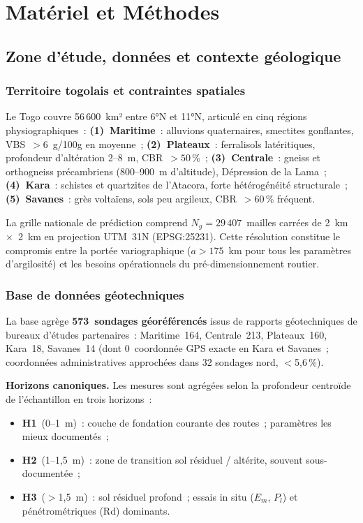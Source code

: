 \documentclass[10pt,a4paper,twocolumn]{article}
\begin{document}
	\section{Matériel et Méthodes}
	\label{sec:methodes}
	
	\subsection{Zone d'étude, données et contexte géologique}
	\label{sec:donnees}
	
	\subsubsection{Territoire togolais et contraintes spatiales}
	
	Le Togo couvre 56\,600~km² entre 6°N et 11°N, articulé en cinq
	régions physiographiques~:
	\textbf{(1)~Maritime}~: alluvions quaternaires, smectites gonflantes,
	VBS~$>6$~g/100g en moyenne~;
	\textbf{(2)~Plateaux}~: ferralisols latéritiques,
	profondeur d'altération 2--8~m, CBR~$>50$\,\%~;
	\textbf{(3)~Centrale}~: gneiss et orthogneiss précambriens (800--900~m
	d'altitude), Dépression de la Lama~;
	\textbf{(4)~Kara}~: schistes et quartzites de l'Atacora,
	forte hétérogénéité structurale~;
	\textbf{(5)~Savanes}~: grès voltaïens, sols peu argileux,
	CBR~$>60$\,\% fréquent.
	
	La grille nationale de prédiction comprend $N_g=29\,407$~mailles
	carrées de 2~km~$\times$~2~km en projection UTM~31N
	(EPSG:25231). Cette résolution constitue le compromis entre la portée
	variographique ($a>175$~km pour tous les paramètres d'argilosité) et
	les besoins opérationnels du pré-dimensionnement routier.
	
	\subsubsection{Base de données géotechniques}
	
	La base agrège \textbf{573~sondages géoréférencés} issus de rapports
	géotechniques de bureaux d'études partenaires~:
	Maritime~164, Centrale~213, Plateaux~160, Kara~18, Savanes~14
		(dont 0~coordonnée GPS exacte en Kara et Savanes~; coordonnées
		administratives approchées dans 32 sondages nord, $<$5{,}6\,\%).
	
	\textbf{Horizons canoniques.}
	Les mesures sont agrégées selon la profondeur centroïde de
	l'échantillon en trois horizons~:
	\begin{itemize}[noitemsep]
		\item \textbf{H1}~(0--1~m)~: couche de fondation courante des routes~;
		paramètres les mieux documentés~;
		\item \textbf{H2}~(1--1{,}5~m)~: zone de transition sol résiduel /
		altérite, souvent sous-documentée~;
		\item \textbf{H3}~($>$1{,}5~m)~: sol résiduel profond~;
		essais in situ ($E_m$, $P_l$) et pénétrométriques (Rd) dominants.
	\end{itemize}
	
\end{document}
